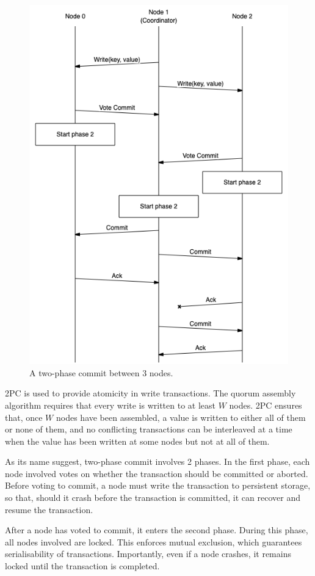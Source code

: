 \documentclass[12pt,a4paper,twoside,openany]{report}
\begin{document}
\begin{figure}[ht!]
\centerline{\includegraphics[width=0.75\linewidth]{figs/2pc.png}}
\caption{A two-phase commit between 3 nodes.}
\label{2pc}
\end{figure}

2PC is used to provide atomicity in write transactions. The quorum assembly algorithm requires that every write is written to at least $W$ nodes. 2PC ensures that, once $W$ nodes have been assembled, a value is written to either all of them or none of them, and no conflicting transactions can be interleaved at a time when the value has been written at some nodes but not at all of them.

As its name suggest, two-phase commit involves 2 phases. In the first phase, each node involved votes on whether the transaction should be committed or aborted. Before voting to commit, a node must write the transaction to persistent storage, so that, should it crash before the transaction is committed, it can recover and resume the transaction.

After a node has voted to commit, it enters the second phase. During this phase, all nodes involved are locked. This enforces mutual exclusion, which guarantees serialisability of transactions. Importantly, even if a node crashes, it remains locked until the transaction is completed.
\end{document}
